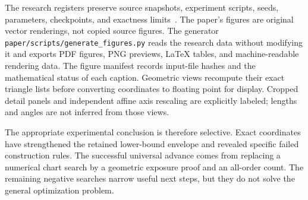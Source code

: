 The research registers preserve source snapshots, experiment scripts, seeds,
parameters, checkpoints, and exactness limits~\cite{zarzueloRepository}. The
paper's figures are original vector renderings, not copied source figures.
The generator \texttt{paper/scripts/generate\_figures.py} reads the research
data without modifying it and exports PDF figures, PNG previews, LaTeX tables,
and machine-readable rendering data. The figure manifest records input-file
hashes and the mathematical status of each caption. Geometric views recompute
their exact triangle lists before converting coordinates to floating point
for display. Cropped detail panels and independent affine axis rescaling are
explicitly labeled; lengths and angles are not inferred from those views.

The appropriate experimental conclusion is therefore selective. Exact
coordinates have strengthened the retained lower-bound envelope and revealed
specific failed construction rules. The successful universal advance comes
from replacing a numerical chart search by a geometric exposure proof and an
all-order count. The remaining negative searches narrow useful next steps,
but they do not solve the general optimization problem.
